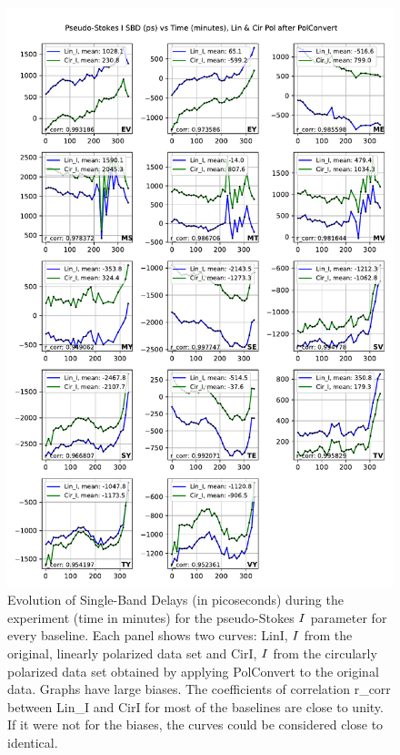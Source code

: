 \documentclass[letterpaper,twoside,12pt]{article}
\begin{document}
\begin{figure}[ht!]
  \begin{center}
  \includegraphics[width=33pc]{SBD_Lin_I_and_Cir_I.pdf}
  \caption{\small Evolution of Single-Band Delays (in picoseconds) during the experiment (time in minutes) for the pseudo-Stokes $\protect I$ parameter for every baseline. Each panel shows two curves: LinI, $\protect I$ from the original, linearly polarized data set and CirI, $\protect I$ from the circularly polarized data set obtained by applying PolConvert to the original data. Graphs have large biases. The coefficients of correlation r\_corr between Lin\_I and CirI for most of the baselines are close to unity. If it were not for the biases, the curves could be considered close to identical.}
  \label{sbd_lin_and_cir}
  \end{center}
\end{figure}
\end{document}
